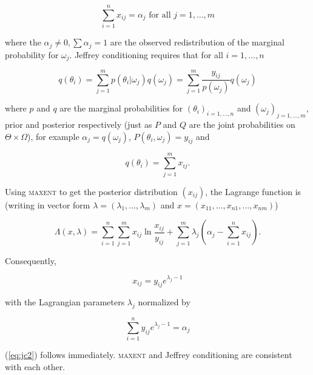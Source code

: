 \documentclass[11pt]{article}
\begin{document}
\begin{equation}
  \label{eq:jc1}
  \sum_{i=1}^{n}x_{ij}=\alpha_{j}\mbox{ for all }j=1,\ldots,m
\end{equation}

where the $\alpha_{j}\neq{}0, \sum\alpha_{j}=1$ are the observed
redistribution of the marginal probability for $\omega_{j}$. Jeffrey
conditioning requires that for all $i=1,\ldots,n$

\begin{equation}
  \label{eq:jc2}
  q(\theta_{i})=\sum_{j=1}^{m}p(\theta_{i}|\omega_{j})q(\omega_{j})=\sum_{j=1}^{m}\frac{y_{ij}}{p(\omega_{j})}q(\omega_{j})
\end{equation}

where $p$ and $q$ are the marginal probabilities for
$(\theta_{i})_{i=1,\ldots,n}$ and $(\omega_{j})_{j=1,\ldots,m}$, prior
and posterior respectively (just as $P$ and $Q$ are the joint
probabilities on $\Theta\times\Omega$), for example
$\alpha_{j}=q(\omega_{j})$, $P(\theta_{i},\omega_{j})=y_{ij}$ and

\begin{equation}
  \label{eq:jc3}
  q(\theta_{i})=\sum_{j=1}^{m}x_{ij}.
\end{equation}

Using \textsc{maxent} to get the posterior distribution $(x_{ij})$,
the Lagrange function is (writing in vector form
$\lambda=(\lambda_{1},\ldots,\lambda_{m})$ and
$x=(x_{11},\ldots,x_{n1},\ldots,x_{nm})$)

\begin{equation}
  \label{eq:jclag}
  \Lambda(x,\lambda)=\sum_{i=1}^{n}\sum_{j=1}^{m}x_{ij}\ln\frac{x_{ij}}{y_{ij}}+\sum_{j=1}^{m}\lambda_{j}\left(\alpha_{j}-\sum_{i=1}^{n}x_{ij}\right).
\end{equation}

Consequently,

\begin{equation}
  \label{eq:jc4}
  x_{ij}=y_{ij}e^{\lambda_{j}-1}
\end{equation}

with the Lagrangian parameters $\lambda_{j}$ normalized by

\begin{equation}
  \label{eq:jc5}
  \sum_{i=1}^{n}y_{ij}e^{\lambda_{j}-1}=\alpha_{j}
\end{equation}

(\ref{eq:jc2}) follows immediately. \textsc{maxent} and Jeffrey
conditioning are consistent with each other.
\end{document}
